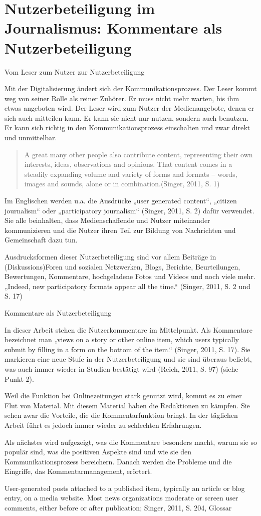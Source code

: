 \chapter{Nutzerbeteiligung im Journalismus: Kommentare als Nutzerbeteiligung}

Vom Leser zum Nutzer zur Nutzerbeteiligung

Mit der Digitalisierung ändert sich der Kommunikationsprozess. Der Leser kommt
weg von seiner Rolle als reiner Zuhörer. Er muss nicht mehr warten, bis ihm
etwas angeboten wird. Der Leser wird zum Nutzer der Medienangebote, denen er
sich auch mitteilen kann. Er kann sie nicht nur nutzen, sondern auch benutzen.
Er kann sich richtig in den Kommunikationsprozess einschalten und zwar direkt
und unmittelbar.

\begin{quote}
\glqq A great many other people also contribute content, representing their own
interests, ideas, observations and opinions. That content comes in a steadily
expanding volume and variety of forms and formats – words, images and sounds,
alone or in combination.\grqq (Singer, 2011, S. 1)
\end{quote}

Im Englischen werden u.a. die Ausdrücke „user generated content“, „citizen
journalism“ oder „participatory journalism“ (Singer, 2011, S. 2) dafür
verwendet. Sie alle beinhalten, dass Medienschaffende und Nutzer miteinander
kommunizieren und die Nutzer ihren Teil zur Bildung von Nachrichten und
Gemeinschaft dazu tun.

Ausdrucksformen dieser Nutzerbeteiligung sind vor allem Beiträge in
(Diskussions)\-Foren und sozialen Netzwerken, Blogs, Berichte, Beurteilungen,
Bewertungen, Kommentare, hochgeladene Fotos und Videos und noch viele mehr.
„Indeed, new participatory formats appear all the time.“ (Singer, 2011, S. 2 und
S. 17)


Kommentare als Nutzerbeteiligung

In dieser Arbeit stehen die Nutzerkommentare im Mittelpunkt. Als Kommentare
bezeichnet man „views on a story or other online item, which users typically
submit by filling in a form on the bottom of the item.“ (Singer, 2011, S. 17).
Sie markieren eine neue Stufe in der Nutzerbeteiligung und sie sind überaus
beliebt, was auch immer wieder in Studien bestätigt wird (Reich, 2011, S. 97)
(siehe Punkt 2).

Weil die Funktion bei Onlinezeitungen stark genutzt wird, kommt es zu einer Flut
von Material. Mit diesem Material haben die Redaktionen zu kämpfen. Sie sehen
zwar die Vorteile, die die Kommentarfunktion bringt. In der täglichen Arbeit
führt es jedoch immer wieder zu schlechten Erfahrungen.

Als nächstes wird aufgezeigt, was die Kommentare besonders macht, warum sie so
populär sind, was die positiven Aspekte sind und wie sie den
Kommunikationsprozess bereichern. Danach werden die Probleme und die Eingriffe, 
das Kommentarmanagement, erörtert.

User-generated posts attached to a published item, typically an article or blog
entry, on a media website. Most news organizations moderate or screen user
comments, either before or after publication; Singer, 2011, S. 204, Glossar